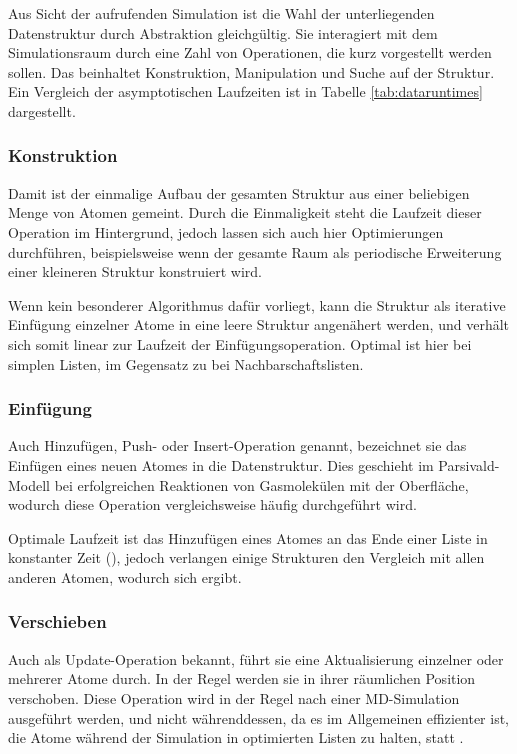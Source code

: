 
Aus Sicht der aufrufenden Simulation ist die Wahl der unterliegenden Datenstruktur durch Abstraktion gleichgültig.
Sie interagiert mit dem Simulationsraum durch eine Zahl von Operationen, die kurz vorgestellt werden sollen.
Das beinhaltet Konstruktion, Manipulation und Suche auf der Struktur.
Ein Vergleich der asymptotischen Laufzeiten ist in Tabelle \ref{tab:dataruntimes} dargestellt.

\subsubsection{Konstruktion}
Damit ist der einmalige Aufbau der gesamten Struktur aus einer beliebigen Menge von Atomen gemeint.
Durch die Einmaligkeit steht die Laufzeit dieser Operation im Hintergrund, jedoch lassen sich auch hier Optimierungen durchführen, beispielsweise wenn der gesamte Raum als periodische Erweiterung einer kleineren Struktur konstruiert wird.

Wenn kein besonderer Algorithmus dafür vorliegt, kann die Struktur als iterative Einfügung einzelner Atome in eine leere Struktur angenähert werden, und verhält sich somit linear zur Laufzeit der Einfügungsoperation.
Optimal ist hier  bei simplen Listen, im Gegensatz zu  bei Nachbarschaftslisten.

\subsubsection{Einfügung}
Auch Hinzufügen, Push- oder Insert-Operation genannt, bezeichnet sie das Einfügen eines neuen Atomes in die Datenstruktur.
Dies geschieht im Parsivald-Modell bei erfolgreichen Reaktionen von Gasmolekülen mit der Oberfläche, wodurch diese Operation vergleichsweise häufig durchgeführt wird.

Optimale Laufzeit ist das Hinzufügen eines Atomes an das Ende einer Liste in konstanter Zeit (), jedoch verlangen einige Strukturen den Vergleich mit allen anderen Atomen, wodurch sich  ergibt.

\subsubsection{Verschieben}
Auch als Up\-date-Operation bekannt, führt sie eine Aktualisierung einzelner oder mehrerer Atome durch.
In der Regel werden sie in ihrer räumlichen Position verschoben.
Diese Operation wird in der Regel nach einer MD-Simulation ausgeführt werden, und nicht währenddessen, da es im Allgemeinen effizienter ist, die Atome während der Simulation in optimierten Listen zu halten, statt .

